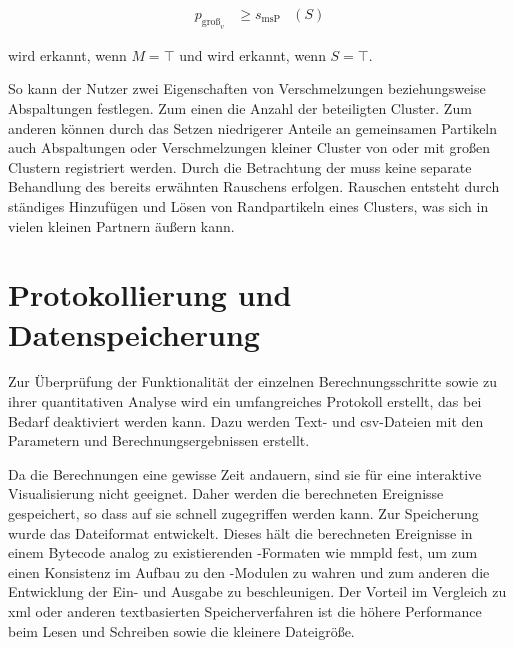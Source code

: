 \begin{equation}
\begin{aligned}\label{eq:split}
p_{\text{groß}_v} &\ge s_\text{msP} &(S)
\end{aligned}
\end{equation}

 wird erkannt, wenn $M = \top$ und  wird erkannt, wenn $S = \top$.

So kann der Nutzer zwei Eigenschaften von Verschmelzungen beziehungsweise Abspaltungen festlegen. Zum einen die Anzahl der beteiligten Cluster. Zum anderen können durch das Setzen niedrigerer Anteile an gemeinsamen Partikeln auch Abspaltungen oder Verschmelzungen kleiner Cluster von oder mit großen Clustern registriert werden. Durch die Betrachtung der  muss keine separate Behandlung des bereits erwähnten Rauschens erfolgen. Rauschen entsteht durch ständiges Hinzufügen und Lösen von Randpartikeln eines Clusters, was sich in vielen kleinen Partnern äußern kann.


\section{Protokollierung und Datenspeicherung}

Zur Überprüfung der Funktionalität der einzelnen Berechnungsschritte sowie zu ihrer quantitativen Analyse wird ein umfangreiches Protokoll erstellt, das bei Bedarf deaktiviert werden kann. Dazu werden Text- und \gls{csv}-Dateien mit den Parametern und Berechnungsergebnissen erstellt.

Da die Berechnungen eine gewisse Zeit andauern, sind sie für eine interaktive Visualisierung nicht geeignet. Daher werden die berechneten Ereignisse gespeichert, so dass auf sie schnell zugegriffen werden kann. Zur Speicherung wurde das Dateiformat \MMSE entwickelt. Dieses hält die berechneten Ereignisse in einem Bytecode analog zu existierenden -Formaten wie \gls{mmpld} fest, um zum einen Konsistenz im Aufbau zu den -Modulen zu wahren und zum anderen die Entwicklung der Ein- und Ausgabe zu beschleunigen. Der Vorteil im Vergleich zu \gls{xml} oder anderen textbasierten Speicherverfahren ist die höhere Performance beim Lesen und Schreiben sowie die kleinere Dateigröße.

